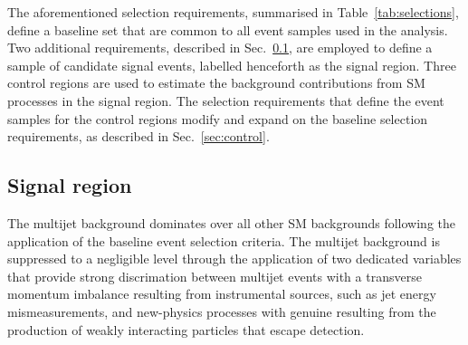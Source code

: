 The aforementioned selection requirements, summarised in
Table~\ref{tab:selections}, define a baseline set that are common to
all event samples used in the analysis. Two additional requirements,
described in Sec.~\ref{sec:signal}, are employed to define a sample of
candidate signal events, labelled henceforth as the signal
region. Three control regions are used to estimate the background
contributions from SM processes in the signal region. The selection
requirements that define the event samples for the control regions
modify and expand on the baseline selection requirements, as described
in Sec.~\ref{sec:control}.


\subsection{Signal region}
\label{sec:signal}

The multijet background dominates over all other SM backgrounds
following the application of the baseline event selection
criteria. The multijet background is suppressed to a negligible level
through the application of two dedicated variables that provide strong
discrimation between multijet events with a transverse momentum
imbalance resulting from instrumental sources, such as jet energy
mismeasurements, and new-physics processes with genuine \ptvecmiss
resulting from the production of weakly interacting particles that
escape detection.

